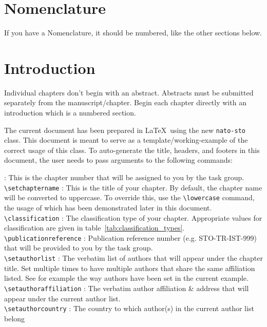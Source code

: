 \documentclass{nato-sto}
\begin{document}
\maketitle


\section{Nomenclature}

If you have a Nomenclature, it should be numbered, like the other sections below.

\section{Introduction}

Individual chapters don't begin with an abstract. Abstracts must be submitted separately from the manuscript/chapter. Begin each chapter directly with an introduction which is a numbered section. 

\noindent The current document has been prepared in \LaTeX ~using the new \verb|nato-sto| class. This document is meant to serve as a template/working-example of the correct usage of this class. To auto-generate the title, headers, and footers in this document, the user needs to pass arguments to the following commands:

\noindent {\verb|\setchapternumber|} : This is the chapter number that will be assigned to you by the task group.\\
{\verb|\setchaptername|} : This is the title of your chapter. By default, the chapter name will be converted to uppercase. To override this, use the \verb|\lowercase| command, the usage of which has been demonstrated later in this document.\\
{\verb|\classification|} : The classification type of your chapter. Appropriate values for classification are given in table~\ref{tab:classification_types}.\\
{\verb|\publicationreference|} : Publication reference number (e.g. STO-TR-IST-999) that will be provided to you by the task group.\\
{\verb|\setauthorlist|} : The verbatim list of authors that will appear under the chapter title. Set multiple times to have multiple authors that share the same affiliation listed. See for example the way authors have been set in the current example.\\
{\verb|\setauthoraffiliation|} : The verbatim author affiliation \& address that will appear under the current author list. \\
{\verb|\setauthorcountry|} : The country to which author(s) in the current author list belong
\end{document}
